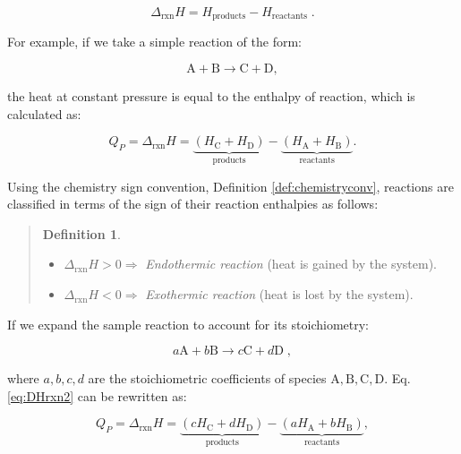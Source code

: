 \documentclass[
  9pt,
]{extbook}
\providecommand{\tightlist}{%
  \setlength{\itemsep}{0pt}\setlength{\parskip}{0pt}}
\theoremstyle{definition}
\newtheorem{definition}{Definition}[chapter]
\theoremstyle{definition}
\theoremstyle{definition}
\theoremstyle{remark}
\begin{document}
\begin{equation}
  \Delta_{\text{rxn}} H = H_{\text{products}}-H_{\text{reactants}} \; .
  \label{eq:DHrxn1}
\end{equation}

For example, if we take a simple reaction of the form:

\[ \mathrm{A} + \mathrm{B} \rightarrow \mathrm{C} + \mathrm{D}, \]

the heat at constant pressure is equal to the enthalpy of reaction, which is calculated as:

\begin{equation}
  Q_P = \Delta_{\text{rxn}} H = \underbrace{ \left (H_{\mathrm{C}}+H_{\mathrm{D}} \right) }_{\text{products}} - \underbrace{\left( H_{\mathrm{A}}+H_{\mathrm{B}}\right)}_{\text{reactants}}.
  \label{eq:DHrxn2}
\end{equation}

Using the chemistry sign convention, Definition \ref{def:chemistryconv}, reactions are classified in terms of the sign of their reaction enthalpies as follows:

\begin{quote}
\begin{definition}
\protect\hypertarget{def:exoendo}{}{\label{def:exoendo} }\(\;\)

\begin{itemize}
\tightlist
\item
  \(\Delta_{\text{rxn}} H > 0 \Rightarrow\) \emph{Endothermic reaction} (heat is gained by the system).
\item
  \(\Delta_{\text{rxn}} H < 0 \Rightarrow\) \emph{Exothermic reaction} (heat is lost by the system).
\end{itemize}
\end{definition}
\end{quote}

If we expand the sample reaction to account for its stoichiometry:

\[ a\mathrm{A} + b\mathrm{B} \rightarrow c\mathrm{C} + d\mathrm{D}\; , \]

where \(a,b,c,d\) are the stoichiometric coefficients of species \(\mathrm{A,B,C,D}\). Eq. \eqref{eq:DHrxn2} can be rewritten as:

\begin{equation}
  Q_P = \Delta_{\text{rxn}} H = \underbrace{\left( cH_{\mathrm{C}}+dH_{\mathrm{D}} \right) }_{\text{products}} - \underbrace{ \left( aH_{\mathrm{A}}+bH_{\mathrm{B}} \right)}_{\text{reactants}},
  \label{eq:DHrxn3}
\end{equation}
\end{document}
